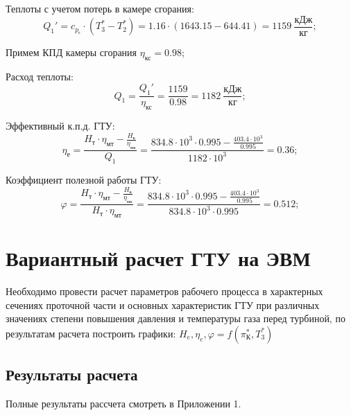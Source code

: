 Теплоты с учетом потерь в камере сгорания:
\begin{equation} \label{eu_eqn}
	Q_{1}'=c_{p_\text{г}}\cdot(T_{3}^*-T_{2}^*)=1.16\cdot(1643.15-644.41)=1159 \ \dfrac{\text{кДж}}{\text{кг}};
\end{equation}

Примем КПД камеры сгорания $\eta_{\text{кс}}=0.98$;

Расход теплоты:
\begin{equation} \label{eu_eqn}
	Q_{1}=\dfrac{Q_{1}'}{\eta_{\text{кс}}}=\dfrac{1159}{0.98}=1182 \ \dfrac{\text{кДж}}{\text{кг}};
\end{equation}

Эффективный к.п.д. ГТУ:
\begin{equation} \label{eu_eqn}
	\eta_{\text{е}}=\dfrac{H_{\text{т}}\cdot \eta_{\text{мт}}-\frac{H_{\text{к}}}{\eta_{\text{мк}}}}{Q_{1}}=\dfrac{834.8\cdot 10^3 \cdot 0.995 -  \frac{403.4\cdot 10^3}{0.995}}{1182\cdot 10^3}=0.36;
\end{equation}

Коэффициент полезной работы ГТУ:
\begin{equation} \label{eu_eqn}
	\varphi=\dfrac{H_{\text{т}}\cdot \eta_{\text{мт}}-\frac{H_{\text{к}}}{\eta_{\text{мк}}}}{H_{\text{т}}\cdot \eta_{\text{мт}}}=\dfrac{834.8\cdot 10^3 \cdot 0.995- \frac{403.4\cdot 10^3}{0.995}}{834.8\cdot 10^3 \cdot 0.995}=0.512;
\end{equation}

\newpage
\section{Вариантный расчет ГТУ на ЭВМ}

Необходимо провести расчет параметров рабочего процесса в характерных сечениях проточной части и основных характеристик ГТУ при различных значениях степени повышения давления и температуры газа перед турбиной, по результатам расчета построить графики: $H_{e}, \eta_{e}, \varphi=f(\pi_{\text{К}}^*, T_3^*)$
\subsection{Результаты расчета}

Полные результаты рассчета смотреть в Приложении 1.



